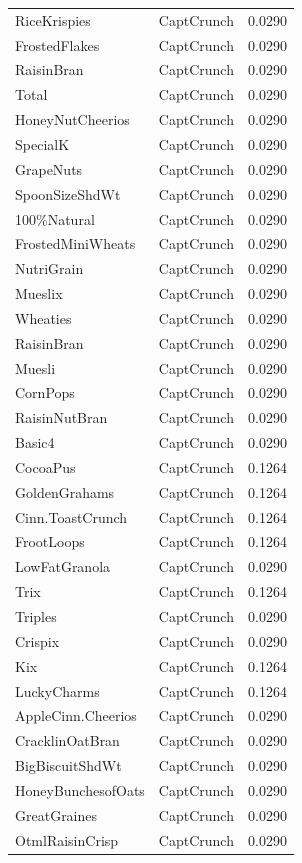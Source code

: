 \begin{table}[!htbp]
\begin{tabular}{lll}
RiceKrispies & CaptCrunch & 0.0290
\\
FrostedFlakes & CaptCrunch & 0.0290
\\
RaisinBran & CaptCrunch & 0.0290
\\
Total & CaptCrunch & 0.0290
\\
HoneyNutCheerios & CaptCrunch & 0.0290
\\
SpecialK & CaptCrunch & 0.0290
\\
GrapeNuts & CaptCrunch & 0.0290
\\
SpoonSizeShdWt & CaptCrunch & 0.0290
\\
100\%Natural & CaptCrunch & 0.0290
\\
FrostedMiniWheats & CaptCrunch & 0.0290
\\
NutriGrain & CaptCrunch & 0.0290
\\
Mueslix & CaptCrunch & 0.0290
\\
Wheaties & CaptCrunch & 0.0290
\\
RaisinBran & CaptCrunch & 0.0290
\\
Muesli & CaptCrunch & 0.0290
\\
CornPops & CaptCrunch & 0.0290
\\
RaisinNutBran & CaptCrunch & 0.0290
\\
Basic4 & CaptCrunch & 0.0290
\\
CocoaPus & CaptCrunch & 0.1264
\\
GoldenGrahams & CaptCrunch & 0.1264
\\
Cinn.ToastCrunch & CaptCrunch & 0.1264
\\
FrootLoops & CaptCrunch & 0.1264
\\
LowFatGranola & CaptCrunch & 0.0290
\\
Trix & CaptCrunch & 0.1264
\\
Triples & CaptCrunch & 0.0290
\\
Crispix & CaptCrunch & 0.0290
\\
Kix & CaptCrunch & 0.1264
\\
LuckyCharms & CaptCrunch & 0.1264
\\
AppleCinn.Cheerios & CaptCrunch & 0.0290
\\
CracklinOatBran & CaptCrunch & 0.0290
\\
BigBiscuitShdWt & CaptCrunch & 0.0290
\\
HoneyBunchesofOats & CaptCrunch & 0.0290
\\
GreatGraines & CaptCrunch & 0.0290
\\
OtmlRaisinCrisp & CaptCrunch & 0.0290
\\

\end{tabular}
\end{table}
